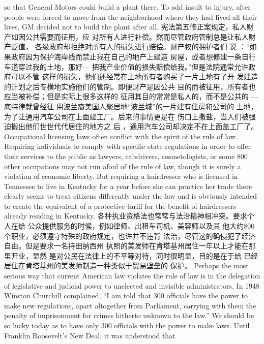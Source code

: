 \begin{paracol}{2}
so that General Motors could build a plant there. To add insult
to injury, after people were forced to move from the neighborhood where they had lived all their lives, GM decided not to
build the plant after all.
\switchcolumn
宪法第五修正案规定，私人财产如因公共需要而征用，应
对所有人进行补偿。然而尽管政府管制总是让私人财产贬值，
各级政府却拒绝对所有人的损失进行赔偿。财产权的拥护者们
说 ：“如果政府因为保护海岸线而禁止我在自己的地产上建造
房屋，或者想修建一条自行车道穿过我的土地，那好--- 把我产业价值的损失赔偿给我。”但是法院通常允许政府可以不管
这样的损失，他们还经常在土地所有者购买了一片土地有了开
发建造的计划之后专横地实施他们的管制。即便财产是因公共
目的而被征用，所有者也应当被补偿；但是实际上很多这样的
征用其目的常常是私人的，而不是公共的 --- 底特律就曾经征
用波兰裔美国人聚居地“波兰城”的一片建有住房和公司的
土地，为了让通用汽车公司在上面建工厂。后来的事情更是在
伤口上撒盐，当人们被强迫搬出他们世世代代居住的地方之
后 ，通用汽车公司却决定不在上面盖工厂了。
\switchcolumn*
Occupational licensing laws often conflict with the spirit of
the rule of law. Requiring individuals to comply with specific
state regulations in order to offer their services to the public as
lawyers, cabdrivers, cosmetologists, or some 800 other occupations may not run afoul of the rule of law, though it is surely a
violation of economic liberty. But requiring a hairdresser who is
licensed in Tennessee to live in Kentucky for a year before she
can practice her trade there clearly seems to treat citizens differently under the law and is obviously intended to create the
equivalent of a protective tariff for the benefit of hairdressers already residing in Kentucky.
\switchcolumn
各种执业资格法也常常与法治精神相冲突。要求个人在给
公众提供服务的时候，例如律师、出租车司机、美容师以及其
他大约800个职业，必须遵守特殊的政府规定，也许并不违背
法治，尽管这的确侵犯了经济自由。但是要求一名持田纳西州
执照的美发师在肯塔基州居住一年以上才能在那里开业，显然
是对公民在法律上的不平等对待，同时很明显，目的是在于给
已经居住在肯塔基州的美发师制造一种类似于贸易壁垒的
保护。
\switchcolumn*
Perhaps the most serious way that current American law violates the rule of law is in the delegation of legislative and judicial power to unelected and invisible administrators. In 1948
Winston Churchill complained, ``I am told that 300 officials
have the power to make new regulations, apart altogether from
Parliament, carrying with them the penalty of imprisonment
for crimes hitherto unknown to the law.'' We should be so lucky
today as to have only 300 officials with the power to make laws.
Until Franklin Roosevelt's New Deal, it was understood that

\end{paracol}
